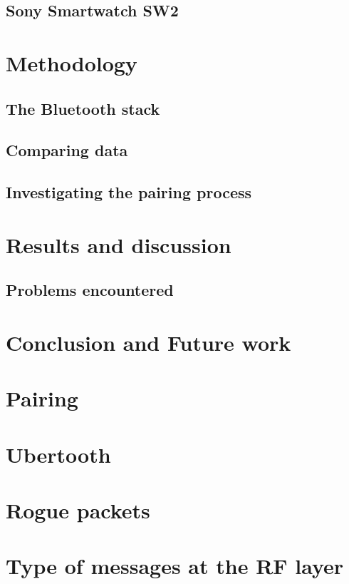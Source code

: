 \documentclass{article}
\begin{document}
	\subsection{Sony Smartwatch SW2} %
	
\newpage
\section{Methodology}		%
 
	\newpage
	\subsection{The Bluetooth stack}
				
		
	\subsection{Comparing data}	%
		
	
	\subsection{Investigating the pairing process}
		
\newpage
\section{Results and discussion}

				
		\newpage
		\subsection{Problems encountered}
		
\newpage
\section{Conclusion and Future work}

\newpage


{}



\newpage

\appendix
\section{Pairing}
\label{app:pairing}
\section{Ubertooth}
\label{app:ubertooth}
\section{Rogue packets}
\label{app:roguepackets}

\section{Type of messages at the RF layer}
\label{app:typesRF}

\end{document}
